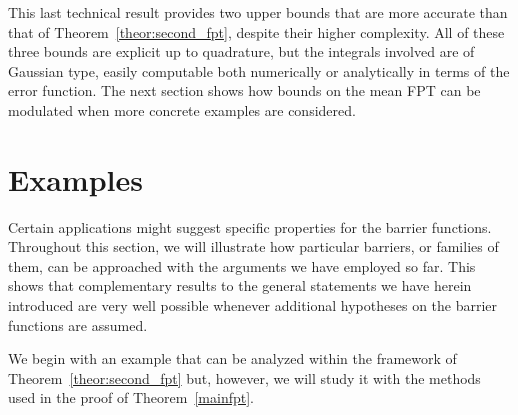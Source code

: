 \documentclass[12pt]{article}
\theoremstyle{definition}
\begin{document}
This last technical result provides two upper bounds that are more accurate than that of Theorem~\ref{theor:second_fpt}, despite their higher complexity. All of these three bounds are explicit up to quadrature, but the integrals involved are of Gaussian type, easily computable both numerically or analytically in terms of the error function. %
The next section shows how bounds on the mean FPT can be modulated when more concrete examples are considered.

\section{Examples}
\label{sec:examples}

Certain applications might suggest specific properties for the barrier functions. Throughout this section, we will illustrate how particular barriers, or families of them, can be approached with the arguments we have employed so far. This shows that complementary results to the general statements we have herein introduced are very well possible whenever additional hypotheses on the barrier functions are assumed.

We begin with an example that can be analyzed within the framework of Theorem~\ref{theor:second_fpt} but, however, we will study it with the methods used in the proof of Theorem~\ref{mainfpt}.
\end{document}
